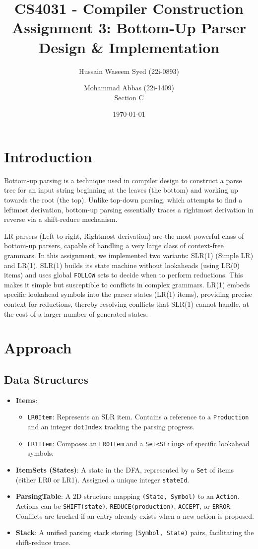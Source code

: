 \documentclass[11pt,a4paper]{article}
\title{CS4031 - Compiler Construction\\Assignment 3: Bottom-Up Parser Design \& Implementation}
\author{Hussain Waseem Syed (22i-0893) \and Mohammad Abbas (22i-1409)\\Section C}
\date{\today}
\begin{document}
\maketitle
\tableofcontents
\newpage

\section{Introduction}
Bottom-up parsing is a technique used in compiler design to construct a parse tree for an input string beginning at the leaves (the bottom) and working up towards the root (the top). Unlike top-down parsing, which attempts to find a leftmost derivation, bottom-up parsing essentially traces a rightmost derivation in reverse via a shift-reduce mechanism. 

LR parsers (Left-to-right, Rightmost derivation) are the most powerful class of bottom-up parsers, capable of handling a very large class of context-free grammars. In this assignment, we implemented two variants: SLR(1) (Simple LR) and LR(1). SLR(1) builds its state machine without lookaheads (using LR(0) items) and uses global \texttt{FOLLOW} sets to decide when to perform reductions. This makes it simple but susceptible to conflicts in complex grammars. LR(1) embeds specific lookahead symbols into the parser states (LR(1) items), providing precise context for reductions, thereby resolving conflicts that SLR(1) cannot handle, at the cost of a larger number of generated states.

\section{Approach}
\subsection{Data Structures}
\begin{itemize}
    \item \textbf{Items}: 
    \begin{itemize}
        \item \texttt{LR0Item}: Represents an SLR item. Contains a reference to a \texttt{Production} and an integer \texttt{dotIndex} tracking the parsing progress.
        \item \texttt{LR1Item}: Composes an \texttt{LR0Item} and a \texttt{Set<String>} of specific lookahead symbols. 
    \end{itemize}
    \item \textbf{ItemSets (States)}: A state in the DFA, represented by a \texttt{Set} of items (either LR0 or LR1). Assigned a unique integer \texttt{stateId}.
    \item \textbf{ParsingTable}: A 2D structure mapping \texttt{(State, Symbol)} to an \texttt{Action}. Actions can be \texttt{SHIFT(state)}, \texttt{REDUCE(production)}, \texttt{ACCEPT}, or \texttt{ERROR}. Conflicts are tracked if an entry already exists when a new action is proposed.
    \item \textbf{Stack}: A unified parsing stack storing \texttt{(Symbol, State)} pairs, facilitating the shift-reduce trace.
\end{itemize}
\end{document}
